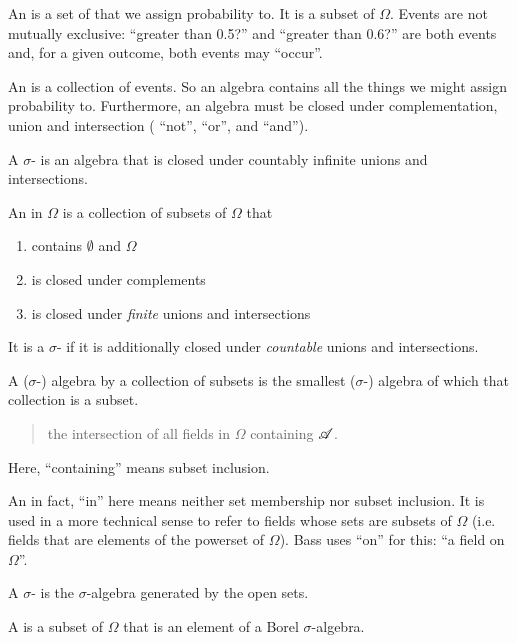 An  is a set of  that we assign probability to. It is a subset of $\Omega$. Events are not mutually
exclusive: ``greater than 0.5?​'' and ``greater than 0.6?​'' are both events and, for a given outcome, both events
may ``occur​''.

An  is a collection of events. So an algebra contains all the things we might assign probability to.
Furthermore, an algebra must be closed under complementation, union and intersection ( ``not​'', ``or​'', and ``and​'').

A $\sigma$- is an algebra that is closed under countably infinite unions and intersections.




\begin{definition*}
  An  in $\Omega$ is a collection of subsets of $\Omega$ that
  \begin{enumerate}
  \item contains $\emptyset$ and $\Omega$
  \item is closed under complements
  \item is closed under {\it finite} unions and intersections
  \end{enumerate}

  It is a $\sigma$- if it is additionally closed under {\it countable} unions and intersections.
\end{definition*}

\begin{definition}
  A ($\sigma$-) algebra  by a collection of subsets is the smallest ($\sigma$-) algebra of which that
  collection is a subset.
\end{definition}


\begin{quote}
  the intersection of all fields in $\Omega$ containing $\mathscr A$.
\end{quote}

Here, ``containing​'' means subset inclusion.

An in fact, ``in​'' here means neither set membership nor subset inclusion. It is used in a more technical sense
to refer to fields whose sets are subsets of $\Omega$ (i.e. fields that are elements of the powerset
of $\Omega$). Bass uses ``on​'' for this: ``a field on $\Omega$​''.

\begin{definition}
  A  $\sigma$- is the $\sigma$-algebra generated by the open sets.

  A  is a subset of $\Omega$ that is an element of a Borel $\sigma$-algebra.
\end{definition}

